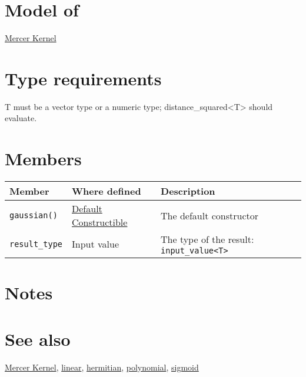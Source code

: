 \documentclass{article}
\begin{document}
\section*{Model of}

\href{\kmlroot/reference/mercer_kernel.html}{Mercer Kernel}

\section*{Type requirements}
T must be a vector type or a numeric type; distance_squared<T> should evaluate.

\section*{Members}

\begin{tabular}{lll}
\textbf{Member} & \textbf{Where defined} & \textbf{Description} \\ 
\hline
\texttt{gaussian()} & \href{http://www.sgi.com/tech/stl/DefaultConstructible.html}{Default Constructible} & The default constructor \\
\texttt{result_type} & Input value & The type of the result: \texttt{input_value<T>} \\
\end{tabular}

\section*{Notes}

\section*{See also}

\href{\kmlroot/reference/mercer_kernel.html}{Mercer Kernel},
\href{\kmlroot/reference/linear.html}{linear},
\href{\kmlroot/reference/hermitian.html}{hermitian},
\href{\kmlroot/reference/polynomial.html}{polynomial},
\href{\kmlroot/reference/sigmoid.html}{sigmoid}



\end{document}
